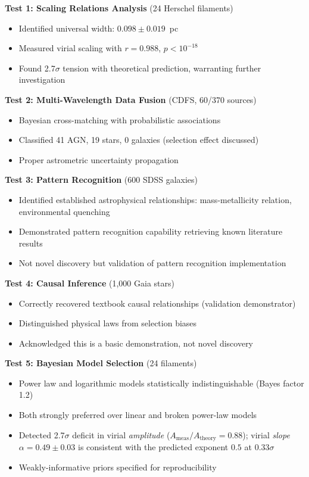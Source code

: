 \documentclass[usenatbib]{rasti}
\begin{document}
\textbf{Test 1: Scaling Relations Analysis} (24 Herschel filaments)
\begin{itemize}
\item Identified universal width: $0.098 \pm 0.019$~pc
\item Measured virial scaling with $r = 0.988$, $p < 10^{-18}$
\item Found 2.7$\sigma$ tension with theoretical prediction, warranting further investigation
\end{itemize}

\textbf{Test 2: Multi-Wavelength Data Fusion} (CDFS, 60/370 sources)
\begin{itemize}
\item Bayesian cross-matching with probabilistic associations
\item Classified 41 AGN, 19 stars, 0 galaxies (selection effect discussed)
\item Proper astrometric uncertainty propagation
\end{itemize}

\textbf{Test 3: Pattern Recognition} (600 SDSS galaxies)
\begin{itemize}
\item Identified established astrophysical relationships: mass-metallicity relation, environmental quenching
\item Demonstrated pattern recognition capability retrieving known literature results
\item Not novel discovery but validation of pattern recognition implementation
\end{itemize}

\textbf{Test 4: Causal Inference} (1,000 Gaia stars)
\begin{itemize}
\item Correctly recovered textbook causal relationships (validation demonstrator)
\item Distinguished physical laws from selection biases
\item Acknowledged this is a basic demonstration, not novel discovery
\end{itemize}

\textbf{Test 5: Bayesian Model Selection} (24 filaments)
\begin{itemize}
\item Power law and logarithmic models statistically indistinguishable (Bayes factor 1.2)
\item Both strongly preferred over linear and broken power-law models
\item Detected 2.7$\sigma$ deficit in virial \emph{amplitude} ($A_{\mathrm{meas}}/A_{\mathrm{theory}} = 0.88$); virial \emph{slope} $\alpha = 0.49 \pm 0.03$ is consistent with the predicted exponent $0.5$ at $0.33\sigma$
\item Weakly-informative priors specified for reproducibility
\end{itemize}
\end{document}
